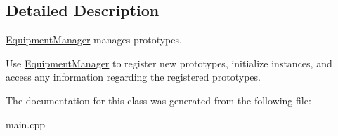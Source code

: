 \subsection{Detailed Description}
\hyperlink{class_equipment_manager}{Equipment\+Manager} manages prototypes.

Use \hyperlink{class_equipment_manager}{Equipment\+Manager} to register new prototypes, initialize instances, and access any information regarding the registered prototypes. 

The documentation for this class was generated from the following file\+:\begin{DoxyCompactItemize}
\item 
main.\+cpp\end{DoxyCompactItemize}
